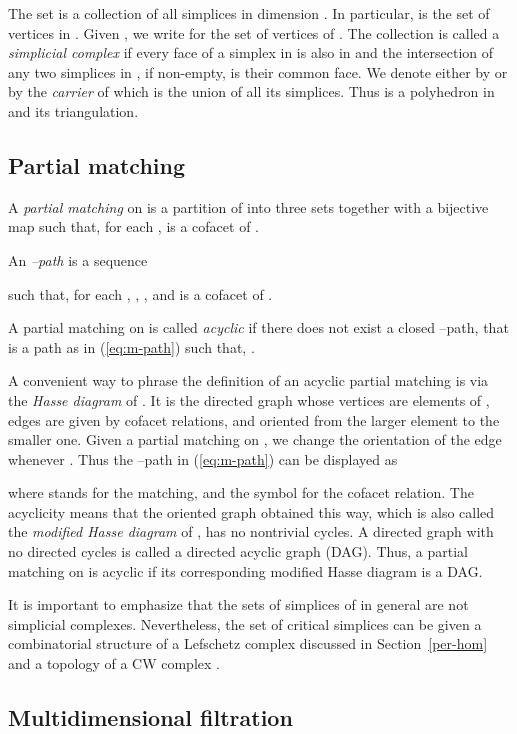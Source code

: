 \documentclass[12pt]{article}
\begin{document}
The set  is a collection of all simplices in  dimension . In particular,  is the set of vertices in . Given , we write  for the set of vertices of . The collection  is called a {\em simplicial complex} if every face of a simplex in  is also in  and the intersection of any two simplices in , if non-empty, is their common face. We denote either by  or by  the {\em carrier} of   which is the union of all its simplices. Thus  is a polyhedron in  and  its triangulation.

\subsection{Partial matching}\label{sec:match}

A {\em partial matching}  on  is a partition of  into three
sets  together with a bijective  map   such that, for each ,  is a cofacet of .

An {\em --path} is a sequence

such that, for each , , , and  is a
cofacet of  .

A partial matching  on  is called {\em acyclic} if there does not exist a closed --path, that is a path as in (\ref{eq:m-path}) such that, .

A convenient way to phrase the definition of an acyclic partial matching is via the {\em Hasse diagram} of . It is the directed graph whose vertices are elements of , edges are given by cofacet relations, and oriented from the larger element to the smaller one. Given a partial matching  on  , we change the orientation of the edge  whenever . Thus the --path in (\ref{eq:m-path}) can be displayed as

where  stands for the matching, and the symbol  for the cofacet relation. The acyclicity means that the oriented graph obtained this way, which is also called the {\em modified Hasse diagram} of , has no nontrivial cycles. A directed graph with no directed cycles is called a directed acyclic graph (DAG). Thus, a partial matching  on  is acyclic if its corresponding modified Hasse diagram is a DAG.

\medskip

It is important to emphasize that the sets of simplices   of  in general are not simplicial complexes. Nevertheless, the set  of critical simplices can be given a combinatorial structure of a Lefschetz complex discussed in Section~\ref{per-hom} and a  topology of a CW complex \cite{Mun84}.

\subsection{Multidimensional filtration}\label{sec:md-f}
\end{document}

